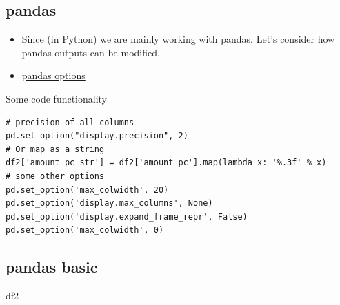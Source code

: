 \documentclass[
  letterpaper,
  DIV=11,
  numbers=noendperiod]{scrartcl}
\newenvironment{Shaded}{\begin{snugshade}}{\end{snugshade}}
\newcommand{\NormalTok}[1]{\textcolor[rgb]{0.00,0.23,0.31}{#1}}
\providecommand{\tightlist}{%
  \setlength{\itemsep}{0pt}\setlength{\parskip}{0pt}}\usepackage{longtable,booktabs,array}
\begin{document}
\hypertarget{pandas}{%
\subsection{pandas}\label{pandas}}

\begin{itemize}
\tightlist
\item
  Since (in Python) we are mainly working with pandas. Let's consider
  how pandas outputs can be modified.
\item
  \href{https://pandas.pydata.org/docs/user_guide/options.html}{pandas
  options}
\end{itemize}

Some code functionality

\begin{verbatim}
# precision of all columns
pd.set_option("display.precision", 2)
# Or map as a string
df2['amount_pc_str'] = df2['amount_pc'].map(lambda x: '%.3f' % x)
# some other options
pd.set_option('max_colwidth', 20)
pd.set_option('display.max_columns', None)
pd.set_option('display.expand_frame_repr', False)
pd.set_option('max_colwidth', 0)
\end{verbatim}

\hypertarget{pandas-basic}{%
\subsection{pandas basic}\label{pandas-basic}}

\begin{Shaded}
\begin{Highlighting}[]
\NormalTok{df2}
\end{Highlighting}
\end{Shaded}
\end{document}

